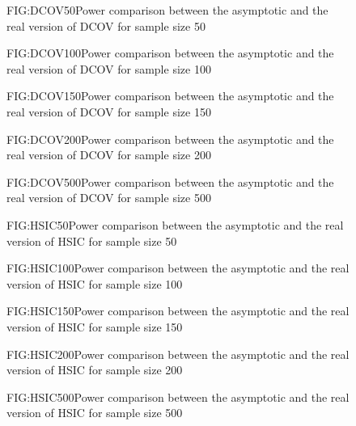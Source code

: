 
\begin{figure}[DCOV asymptotic size 50]{FIG:DCOV50}{Power comparison between the asymptotic and the real version of DCOV for sample size 50}
\end{figure}
\begin{figure}[DCOV asymptotic size 100]{FIG:DCOV100}{Power comparison between the asymptotic and the real version of DCOV for sample size 100}
\end{figure}
\begin{figure}[DCOV asymptotic size 150]{FIG:DCOV150}{Power comparison between the asymptotic and the real version of DCOV for sample size 150}
\end{figure}
\begin{figure}[DCOV asymptotic size 200]{FIG:DCOV200}{Power comparison between the asymptotic and the real version of DCOV for sample size 200}
\end{figure}
\begin{figure}[DCOV asymptotic size 500]{FIG:DCOV500}{Power comparison between the asymptotic and the real version of DCOV for sample size 500}
\end{figure}
\begin{figure}[HSIC asymptotic size 50]{FIG:HSIC50}{Power comparison between the asymptotic and the real version of HSIC for sample size 50}
\end{figure}
\begin{figure}[HSIC asymptotic size 100]{FIG:HSIC100}{Power comparison between the asymptotic and the real version of HSIC for sample size 100}
\end{figure}
\begin{figure}[HSIC asymptotic size 150]{FIG:HSIC150}{Power comparison between the asymptotic and the real version of HSIC for sample size 150}
\end{figure}
\begin{figure}[HSIC asymptotic size 200]{FIG:HSIC200}{Power comparison between the asymptotic and the real version of HSIC for sample size 200}
\end{figure}
\begin{figure}[HSIC asymptotic size 500]{FIG:HSIC500}{Power comparison between the asymptotic and the real version of HSIC for sample size 500}
\end{figure}
